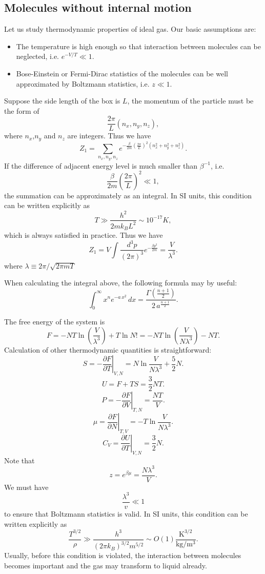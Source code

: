 \subsection{Molecules without internal motion}
Let us study thermodynamic properties of ideal gas. Our basic assumptions are:
\begin{itemize}
\item The temperature is high enough so that interaction between molecules can be neglected, i.e. $e^{-{V}/{T}} \ll 1$.
\item Bose-Einstein or Fermi-Dirac statistics of the molecules can be well approximated by Boltzmann statistics, i.e. $z \ll 1$.
\end{itemize}
Suppose the side length of the box is $L$, the momentum of the particle must be the form of
\[\frac{2\pi}{L}(n_x,n_y,n_z),\]
where $n_x$,$n_y$ and $n_z$ are integers. 
Thus we have
\[Z_1 = \sum_{n_x,n_y,n_z} e^{-\frac{\beta}{2m} (\frac{2\pi}{L})^2(n_x^2 + n_y^2 + n_z^2)}.\]
If the difference of adjacent energy level is much smaller than $\beta^{-1}$, i.e.
\[\frac{\beta}{2m} (\frac{2\pi}{L})^2 \ll 1,\] 
the summation can be approximately as an integral. 
In SI units, this condition can be written explicitly as
\[T \gg \frac{h^2}{2mk_BL^2} \sim 10^{-17}K,\] 
which is always satisfied in practice. 
Thus we have
\[Z_1 = V \int \frac{d^3p}{(2\pi)^3} e^{-\frac{\beta p^2}{2m}} = \frac{V}{\lambda^3}.\]
where $\lambda \equiv {2\pi}/{\sqrt{2\pi m T}}$
\begin{note}
When calculating the integral above, the following formula may by useful: 
\[\int _{0}^{\infty }x^{n}e^{-a\,x^{2}}\,dx={\frac {\Gamma ({\frac {n+1}{2}})}{2\,a^{\frac {n+1}{2}}}}.\]
\end{note}
\noindent
The free energy of the system is
\[F = -NT\ln(\frac{V}{\lambda^3}) + T\ln N! = -NT\ln(\frac{V}{N\lambda^3}) - NT.\]
Calculation of other thermodynamic quantities is straightforward:
\[S = -\left. \frac{\partial F}{\partial T} \right|_{V,N} = N \ln \frac{V}{N\lambda^3} + \frac{5}{2}N.\]
\[U = F + TS = \frac{3}{2}NT.\]
\[P = -\left. \frac{\partial F}{\partial V} \right|_{T,N} = \frac{NT}{V}.\]
\[\mu = \left. \frac{\partial F}{\partial N} \right|_{T,V} = -T \ln \frac{V}{N\lambda^3}.\]
\[C_V = \left. \frac{\partial U}{\partial T} \right|_{V,N} = \frac{3}{2}N.\]
Note that
\[z = e^{\beta \mu} = \frac{N\lambda^3}{V}.\]
We must have
\[\frac{\lambda^3}{v} \ll 1 \]
to ensure that Boltzmann statistics is valid. 
In SI units, this condition can be written explicitly as
\[\frac{T^{3/2}}{\rho} \gg \frac{h^3}{(2\pi k_B )^{3/2}m^{5/2}} \sim O(1) \frac{\mathrm{K^{3/2}}}{\mathrm{kg/m^3}}.\]
Usually, before this condition is violated, the interaction between molecules becomes important and the gas may transform to liquid already.

